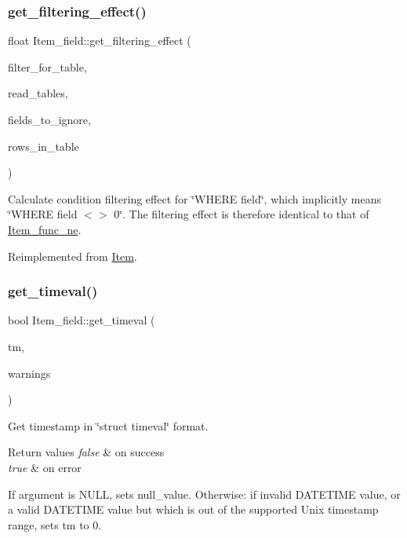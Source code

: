 \subsubsection{\texorpdfstring{get\+\_\+filtering\+\_\+effect()}{get\_filtering\_effect()}}
{\footnotesize\ttfamily float Item\+\_\+field\+::get\+\_\+filtering\+\_\+effect (\begin{DoxyParamCaption}\item[{table\+\_\+map}]{filter\+\_\+for\+\_\+table,  }\item[{table\+\_\+map}]{read\+\_\+tables,  }\item[{const M\+Y\+\_\+\+B\+I\+T\+M\+AP $\ast$}]{fields\+\_\+to\+\_\+ignore,  }\item[{double}]{rows\+\_\+in\+\_\+table }\end{DoxyParamCaption})\hspace{0.3cm}{\ttfamily [virtual]}}

Calculate condition filtering effect for \char`\"{}\+W\+H\+E\+R\+E field\char`\"{}, which implicitly means \char`\"{}\+W\+H\+E\+R\+E field $<$$>$ 0\char`\"{}. The filtering effect is therefore identical to that of \mbox{\hyperlink{classItem__func__ne}{Item\+\_\+func\+\_\+ne}}. 

Reimplemented from \mbox{\hyperlink{classItem_a83f65da25aae04ad1aecebc1d43832c0}{Item}}.

\mbox{\label{classItem__field_a1b77cc2e083b73e7f7640a0633be6312}} 
\subsubsection{\texorpdfstring{get\+\_\+timeval()}{get\_timeval()}}
{\footnotesize\ttfamily bool Item\+\_\+field\+::get\+\_\+timeval (\begin{DoxyParamCaption}\item[{struct timeval $\ast$}]{tm,  }\item[{int $\ast$}]{warnings }\end{DoxyParamCaption})\hspace{0.3cm}{\ttfamily [virtual]}}

Get timestamp in \char`\"{}struct timeval\char`\"{} format. 
\begin{DoxyRetVals}{Return values}
{\em false} & on success \\
\hline
{\em true} & on error\\
\hline
\end{DoxyRetVals}
If argument is N\+U\+LL, sets null\+\_\+value. Otherwise\+: if invalid D\+A\+T\+E\+T\+I\+ME value, or a valid D\+A\+T\+E\+T\+I\+ME value but which is out of the supported Unix timestamp range, sets \textquotesingle{}tm\textquotesingle{} to 0. 

